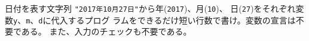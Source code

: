\begin{Prob}\upshape\Must
日付を表す文字列 \Verb+"2017年10月27日"+から年(\Verb+2017+)、月(\Verb+10+)、
 日(\Verb+27+)をそれぞれ変数\Verb+y+、\Verb+m+、\Verb+d+に代入するプログ
 ラムをできるだけ短い行数で書け。変数の宣言は不要である。
 また、入力のチェックも不要である。\\[0.02\textheight]
\end{Prob}
